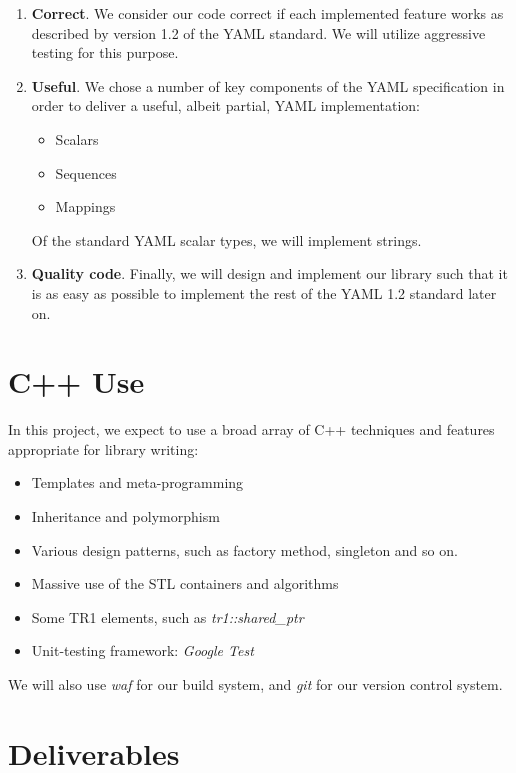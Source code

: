 \documentclass{article}
\begin{document}
\begin{enumerate}
  \item \textbf{Correct}.  We consider our code correct if each implemented feature works as described by version 1.2 of the YAML standard.  We will utilize aggressive testing for this purpose.
  \item \textbf{Useful}.  We chose a number of key components of the YAML specification in order to deliver a useful, albeit partial, YAML implementation:
    \begin{itemize}
      \item Scalars
      \item Sequences
      \item Mappings
    \end{itemize}
    Of the standard YAML scalar types, we will implement strings.
  \item \textbf{Quality code}.  Finally, we will design and implement our library such that it is as easy as possible to implement the rest of the YAML 1.2 standard later on.
\end{enumerate}

\section{C++ Use}

In this project, we expect to use a broad array of C++ techniques and features appropriate for library writing:

\begin{itemize}
  \item Templates and meta-programming
  \item Inheritance and polymorphism
  \item Various design patterns, such as factory method, singleton and so on.
  \item Massive use of the STL containers and algorithms
  \item Some TR1 elements, such as \emph{tr1::shared\_ptr}
  \item Unit-testing framework:  \emph{Google Test}
\end{itemize}

We will also use \emph{waf} for our build system, and \emph{git} for our version control system.

\section{Deliverables}
\end{document}
